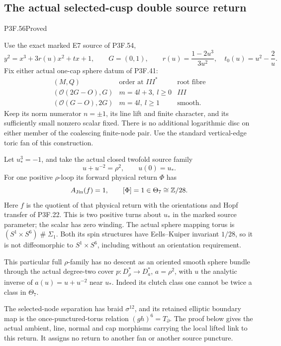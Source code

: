 \subsection{The actual selected-cusp double source return}
\begin{statement}{P3F.56}{Proved}

Use the exact marked E7 source of P3F.54,
\[
 y^2=x^3+3r(u)x^2+t x+1,\qquad G=(0,1),\qquad
 r(u)=\frac{1-2u^3}{3u^2},\quad t_0(u)=u^2-\frac2u.
\]
Fix either actual one-cap sphere datum of P3F.41:
\[
 \begin{array}{c|c|c}
 (M,Q)&\text{order at }III^*&\text{root fibre}\\ \hline
 (\mathcal O(2G-O),G)&m=4l+3,\ l\ge0&III\\
 (\mathcal O(G-O),2G)&m=4l,\ l\ge1&\text{smooth}.
 \end{array}
\]
Keep its norm numerator \(n=\pm1\), its line lift and finite character,
and its sufficiently small nonzero scalar fixed. There is no additional
logarithmic disc on either member of the coalescing finite-node pair.
Use the standard vertical-edge toric fan of this construction.

Let \(u_*^3=-1\), and take the actual closed twofold source family
\[
 u+u^{-2}=\rho^2,\qquad u(0)=u_*.
\]
For one positive \(\rho\)-loop its forward physical return \(\Phi\)
has
\[
 A_{\rm Jin}(f)=1,\qquad [\Phi]=1\in\Theta_7\cong\mathbb Z/28.
\]
Here \(f\) is the quotient of that physical return with the orientations
and Hopf transfer of P3F.22. This is two positive turns about \(u_*\)
in the marked source parameter; the scalar has zero winding.
The actual sphere mapping torus is
\((S^1\times S^6)\mathbin{\#}\Sigma_1\). Both its spin structures
have Eells--Kuiper invariant \(1/28\), so it is not diffeomorphic to
\(S^1\times S^6\), including without an orientation requirement.

This particular full \(\rho\)-family has no descent as an oriented
smooth sphere bundle through the actual degree-two cover
\(p:D_\rho^*\to D_a^*\), \(a=\rho^2\), with \(u\) the analytic
inverse of \(a(u)=u+u^{-2}\) near \(u_*\). Indeed its clutch class
one cannot be twice a class in \(\Theta_7\).

The selected-node separation has braid \(\sigma^{12}\), and its
retained elliptic boundary map is the once-punctured-torus relation
\((gh)^6=T_{\partial}\). The proof below gives the actual ambient,
line, normal and cap morphisms carrying the local lifted link to this
return. It assigns no return to another fan or another source puncture.

\end{statement}
